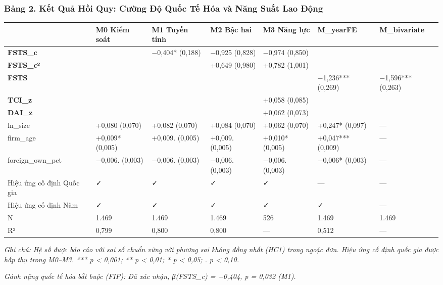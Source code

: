 \documentclass[12pt,a4paper]{article}
\begin{document}
\hypertarget{bux1ea3ng-2-kux1ebft-quux1ea3-hux1ed3i-quy-cux1b0ux1eddng-ux111ux1ed9-quux1ed1c-tux1ebf-huxf3a-vuxe0-nux103ng-suux1ea5t-lao-ux111ux1ed9ng}{%
\subsubsection{Bảng 2. Kết Quả Hồi Quy: Cường Độ Quốc Tế Hóa và Năng
Suất Lao
Động}\label{bux1ea3ng-2-kux1ebft-quux1ea3-hux1ed3i-quy-cux1b0ux1eddng-ux111ux1ed9-quux1ed1c-tux1ebf-huxf3a-vuxe0-nux103ng-suux1ea5t-lao-ux111ux1ed9ng}}

\begin{longtable}[]{@{}lllllll@{}}
\toprule\noalign{}
& M0 Kiểm soát & M1 Tuyến tính & M2 Bậc hai & M3 Năng lực & M\_yearFE &
M\_bivariate \\
\midrule\noalign{}
\endhead
\bottomrule\noalign{}
\endlastfoot
\textbf{FSTS\_c} & & −0,404* (0,188) & −0,925 (0,828) & −0,974 (0,850) &
& \\
\textbf{FSTS\_c²} & & & +0,649 (0,980) & +0,782 (1,001) & & \\
\textbf{FSTS} & & & & & −1,236*** (0,269) & −1,596*** (0,263) \\
\textbf{TCI\_z} & & & & +0,058 (0,085) & & \\
\textbf{DAI\_z} & & & & +0,062 (0,073) & & \\
ln\_size & +0,080 (0,070) & +0,082 (0,070) & +0,084 (0,070) & +0,062
(0,070) & +0,247* (0,097) & --- \\
firm\_age & +0,009* (0,005) & +0,009. (0,005) & +0,009. (0,005) &
+0,010* (0,005) & +0,047*** (0,009) & --- \\
foreign\_own\_pct & −0,006. (0,003) & −0,006. (0,003) & −0,006. (0,003)
& −0,006. (0,003) & −0,006* (0,003) & --- \\
Hiệu ứng cố định Quốc gia & ✓ & ✓ & ✓ & ✓ & --- & --- \\
Hiệu ứng cố định Năm & ✓ & ✓ & ✓ & ✓ & ✓ & --- \\
N & 1.469 & 1.469 & 1.469 & 526 & 1.469 & 1.469 \\
R² & 0,799 & 0,800 & 0,800 & --- & 0,512 & --- \\
\end{longtable}

\emph{Ghi chú: Hệ số được báo cáo với sai số chuẩn vững với phương sai
không đồng nhất (HC1) trong ngoặc đơn. Hiệu ứng cố định quốc gia được
hấp thụ trong M0--M3. *** p \textless{} 0,001; ** p \textless{} 0,01; *
p \textless{} 0,05; . p \textless{} 0,10.}

\emph{Gánh nặng quốc tế hóa bắt buộc (FIP): Đã xác nhận, β(FSTS\_c) =
−0,404, p = 0,032 (M1).}
\end{document}
